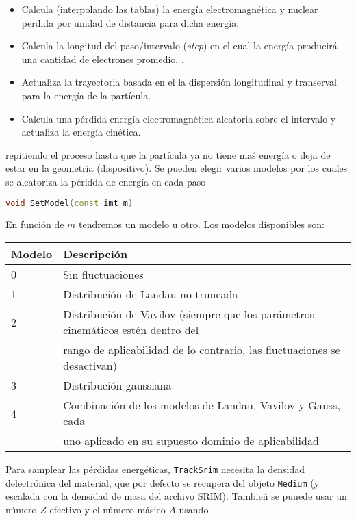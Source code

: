 \begin{itemize}
    \item Calcula (interpolando las tablas) la energía electromagnética y nuclear perdida por unidad de distancia para dicha energía.
    \item Calcula la longitud del paso/intervalo (\textit{step}) en el cual la energía producirá una cantidad de electrones promedio. .
    \item Actualiza la trayectoria basada en el la dispersión longitudinal y transerval para la energía de la partícula. 
    \item Calcula una pérdida energía electromagnética aleatoria sobre el intervalo y actualiza la energía cinética.
\end{itemize}
repitiendo el proceso hasta que la partícula ya no tiene maś energía o deja de estar en la geometría (dispositivo). Se pueden elegir varios modelos por los cuales se aleatoriza la péridda de energía en cada paso

\begin{lstlisting}[language=C++,style=c++]
void SetModel(const imt m) 
\end{lstlisting}
\vspace*{0.6em}
En función de $m$ tendremos un modelo u otro. Los modelos disponibles son: 

\begin{table}[h!]
\centering
\begin{tabular}{ll}
\toprule
\textbf{Modelo} & \textbf{Descripción} \\
\midrule
0 & Sin fluctuaciones \\
1 & Distribución de Landau no truncada \\
2 & Distribución de Vavilov (siempre que los parámetros cinemáticos estén dentro del \\ & rango de aplicabilidad de lo contrario, las fluctuaciones se desactivan) \\
3 & Distribución gaussiana \\
4 & Combinación de los modelos de Landau, Vavilov y Gauss, cada \\
  &  uno aplicado en su supuesto dominio de aplicabilidad \\
\bottomrule
\end{tabular}
\end{table}

Para samplear las pérdidas energéticas, \texttt{TrackSrim} necesita la densidad delectrónica del material, que por defecto se recupera del objeto \texttt{Medium} (y escalada con la densidad de masa del archivo SRIM). Tambień se puuede usar un número $Z$ efectivo y el número másico $A$ usando


